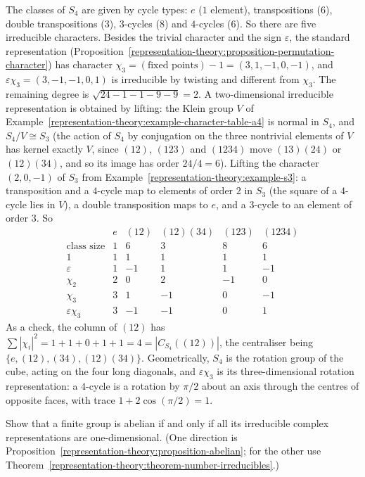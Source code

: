 \begin{solution}
The classes of $S_4$ are given by cycle types: $e$ ($1$ element), transpositions ($6$), double transpositions ($3$), $3$-cycles ($8$) and $4$-cycles ($6$). So there are five
irreducible characters. Besides the trivial character and the sign $\varepsilon$, the standard representation (Proposition~\ref{representation-theory:proposition-permutation-character})
has character $\chi_3 = (\text{fixed points}) - 1 = (3, 1, -1, 0, -1)$, and $\varepsilon\chi_3 = (3, -1, -1, 0, 1)$ is irreducible by twisting and different from $\chi_3$. The
remaining degree is $\sqrt{24 - 1 - 1 - 9 - 9} = 2$. A two-dimensional irreducible representation is obtained by lifting: the Klein group $V$ of
Example~\ref{representation-theory:example-character-table-a4} is normal in $S_4$, and $S_4/V \cong S_3$ (the action of $S_4$ by conjugation on the three nontrivial elements
of $V$ has kernel exactly $V$, since $(12)$, $(123)$ and $(1234)$ move $(13)(24)$ or $(12)(34)$, and so its image has order $24/4 = 6$). Lifting the character $(2, 0, -1)$ of $S_3$ from Example~\ref{representation-theory:example-s3}: a
transposition and a $4$-cycle map to elements of order $2$ in $S_3$ (the square of a $4$-cycle lies in $V$), a double transposition maps to $e$, and a $3$-cycle to an element
of order $3$. So
\[
\begin{array}{c|ccccc}
 & e & (12) & (12)(34) & (123) & (1234)\\
\text{class size} & 1 & 6 & 3 & 8 & 6\\
\hline
1 & 1 & 1 & 1 & 1 & 1\\
\varepsilon & 1 & -1 & 1 & 1 & -1\\
\chi_2 & 2 & 0 & 2 & -1 & 0\\
\chi_3 & 3 & 1 & -1 & 0 & -1\\
\varepsilon\chi_3 & 3 & -1 & -1 & 0 & 1
\end{array}
\]
As a check, the column of $(12)$ has $\sum|\chi_i|^2 = 1 + 1 + 0 + 1 + 1 = 4 = |C_{S_4}((12))|$, the centraliser being $\{e, (12), (34), (12)(34)\}$. Geometrically, $S_4$ is the rotation
group of the cube, acting on the four long diagonals, and $\varepsilon\chi_3$ is its three-dimensional rotation representation: a $4$-cycle is a rotation by $\pi/2$ about an axis
through the centres of opposite faces, with trace $1 + 2\cos(\pi/2) = 1$.
\end{solution}

\begin{exercise}\label{representation-theory:exercise-abelian-irreducible}
Show that a finite group is abelian if and only if all its irreducible complex representations are one-dimensional. (One direction is
Proposition~\ref{representation-theory:proposition-abelian}; for the other use Theorem~\ref{representation-theory:theorem-number-irreducibles}.)
\end{exercise}

